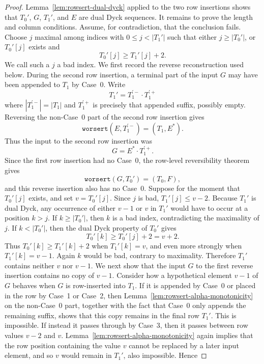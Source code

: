 \documentclass[11pt]{article}
\theoremstyle{plain}
\theoremstyle{definition}
\theoremstyle{remark}
\newcommand{\worsert}{\texttt{worsert}}
\begin{document}
\begin{proof}
Lemma~\ref{lem:rowsert-dual-dyck} applied to the two row insertions shows that
\(T_0'\), \(G\), \(T_1'\), and \(E\) are dual Dyck sequences.  It remains to
prove the length and column conditions.
Assume, for contradiction, that the conclusion fails.  Choose \(j\) maximal
among indices with \(0\le j<|T_1'|\) such that either \(j\ge |T_0'|\), or
\(T_0'[j]\) exists and
\[
  T_0'[j]\ge T_1'[j]+2.
\]
We call such a \(j\) a bad index.
We first record the reverse reconstruction used below.  During the second row
insertion, a terminal part of the input \(G\) may have been appended to \(T_1\)
by Case~0.  Write
\[
  T_1'=T_1^{\prime -}\cdot T_1^{\prime +}
\]
where \(|T_1^{\prime -}|=|T_1|\) and \(T_1^{\prime +}\) is precisely that
appended suffix, possibly empty.  Reversing the non-Case~0 part of the second
row insertion gives
\[
  \worsert(E,T_1^{\prime -})=(T_1,E^*).
\]
Thus the input to the second row insertion was
\[
  G=E^*\cdot T_1^{\prime +}.
\]
Since the first row insertion had no Case~0, the row-level reversibility theorem
gives
\[
  \worsert(G,T_0')=(T_0,F),
\]
and this reverse insertion also has no Case~0.
Suppose for the moment that \(T_0'[j]\) exists, and set \(v=T_0'[j]\).  Since
\(j\) is bad, \(T_1'[j]\le v-2\).  Because \(T_1'\) is dual Dyck, any occurrence
of either \(v-1\) or \(v\) in \(T_1'\) would have to occur at a position
\(k>j\).  If \(k\ge |T_0'|\), then \(k\) is a bad index, contradicting the
maximality of \(j\).  If \(k<|T_0'|\), then the dual Dyck property of \(T_0'\)
gives
\[
  T_0'[k]\ge T_0'[j]+2=v+2.
\]
Thus \(T_0'[k]\ge T_1'[k]+2\) when \(T_1'[k]=v\), and even more strongly when
\(T_1'[k]=v-1\).  Again \(k\) would be bad, contrary to maximality.  Therefore
\(T_1'\) contains neither \(v\) nor \(v-1\).
We next show that the input \(G\) to the first reverse insertion contains no
copy of \(v-1\).  Consider how a hypothetical element \(v-1\) of \(G\) behaves
when \(G\) is row-inserted into \(T_1\).  If it is appended by Case~0 or placed
in the row by Case~1 or Case~2, then Lemma~\ref{lem:rowsert-alpha-monotonicity}
on the non-Case~0 part, together with the fact that Case~0 only appends the
remaining suffix, shows that this copy remains in the final row \(T_1'\).  This
is impossible.  If instead it passes through by Case~3, then it passes between
row values \(v-2\) and \(v\).  Lemma~\ref{lem:rowsert-alpha-monotonicity} again
implies that the row position containing the value \(v\) cannot be replaced by
a later input element, and so \(v\) would remain in \(T_1'\), also impossible.
Hence

\end{proof}
\end{document}
